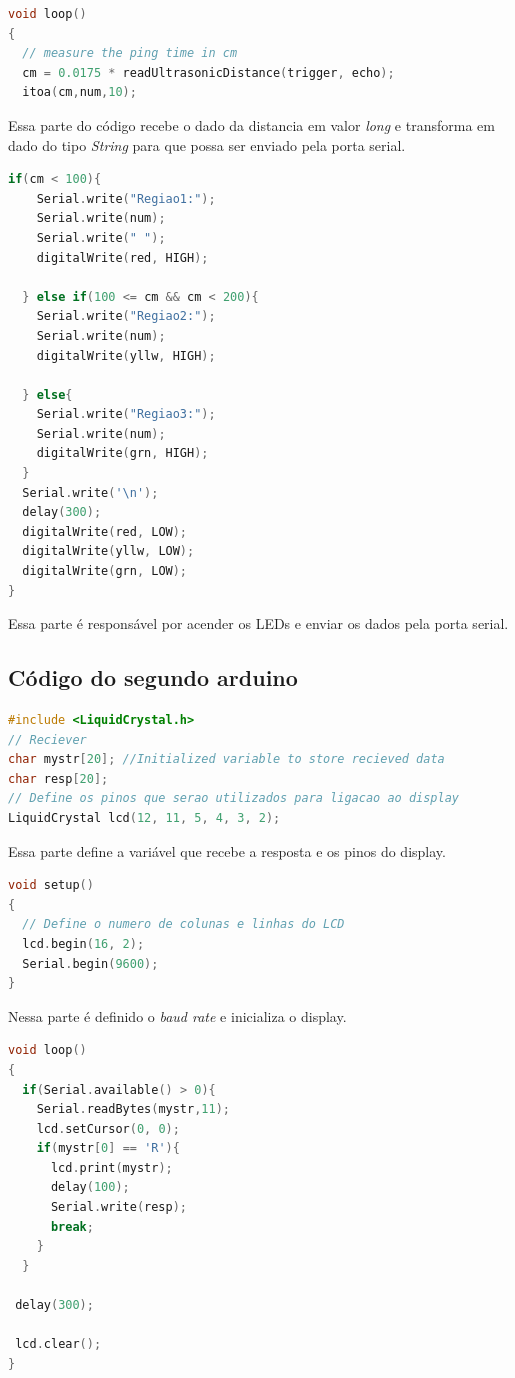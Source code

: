 \documentclass[conference]{IEEEtran}
\begin{document}
\begin{lstlisting}[language=C]
void loop()
{
  // measure the ping time in cm
  cm = 0.0175 * readUltrasonicDistance(trigger, echo);
  itoa(cm,num,10);
\end{lstlisting}

Essa parte do código recebe o dado da distancia em valor \textit{long} e transforma em dado do tipo \textit{String} para que possa ser enviado pela porta serial.

\begin{lstlisting}[language=C]
  if(cm < 100){
    Serial.write("Regiao1:");
    Serial.write(num);
    Serial.write(" ");
    digitalWrite(red, HIGH);
    
  } else if(100 <= cm && cm < 200){
    Serial.write("Regiao2:");
    Serial.write(num);
    digitalWrite(yllw, HIGH);
    
  } else{
    Serial.write("Regiao3:");
    Serial.write(num);
    digitalWrite(grn, HIGH);
  }
  Serial.write('\n');
  delay(300);
  digitalWrite(red, LOW);
  digitalWrite(yllw, LOW);
  digitalWrite(grn, LOW);
}
\end{lstlisting}

Essa parte é responsável por acender os LEDs e enviar os dados pela porta serial.

\subsection{Código do segundo arduino}

\begin{lstlisting}[language=C]
#include <LiquidCrystal.h>
// Reciever
char mystr[20]; //Initialized variable to store recieved data
char resp[20];
// Define os pinos que serao utilizados para ligacao ao display
LiquidCrystal lcd(12, 11, 5, 4, 3, 2);
\end{lstlisting}

Essa parte define a variável que recebe a resposta e os pinos do display.


\begin{lstlisting}[language=C]
void setup()
{
  // Define o numero de colunas e linhas do LCD
  lcd.begin(16, 2);
  Serial.begin(9600);
}
\end{lstlisting}

Nessa parte é definido o \textit{baud rate} e inicializa o display.

\begin{lstlisting}[language=C]
    void loop()
{
  if(Serial.available() > 0){
    Serial.readBytes(mystr,11);
    lcd.setCursor(0, 0);
    if(mystr[0] == 'R'){
      lcd.print(mystr);
      delay(100);
      Serial.write(resp);
      break;
    }
  }
 
 delay(300);
 
 lcd.clear();
}
\end{lstlisting}
\end{document}
